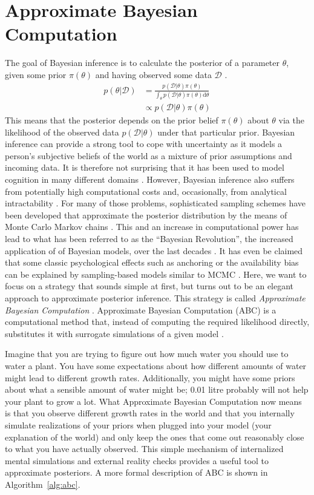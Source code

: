 \documentclass[a4paper,man, natbib]{apa6}
\begin{document}
\section{Approximate Bayesian Computation}
The goal of Bayesian inference is to calculate the posterior of a parameter $\theta$, given some prior $\pi(\theta)$ and having observed some data $\mathcal{D}$ \citep{lindley1972bayesian}.
\begin{align}
p(\theta|\mathcal{D})&=\frac{p(\mathcal{D}|\theta)\pi(\theta)}{\int_{\theta} p(\mathcal{D}|\theta)\pi(\theta) \text{d} \theta}\\
& \propto p(\mathcal{D}|\theta)\pi(\theta)
\end{align}
This means that the posterior depends on the prior belief $\pi(\theta)$ about $\theta$ via the likelihood of the observed data $p(\mathcal{D}|\theta)$ under that particular prior. Bayesian inference can provide a strong tool to cope with uncertainty as it models a person's subjective beliefs of the world as a mixture of prior assumptions and incoming data. It is therefore not surprising that it has been used to model cognition in many different domains \citep{oaksford2007bayesian}. However, Bayesian inference also suffers from potentially high computational costs and, occasionally, from analytical intractability \citep{dagum1993approximating}. For many of those problems, sophisticated sampling schemes have been developed that approximate the posterior distribution by the means of Monte Carlo Markov chains \citep{gilks2005markov}. This and an increase in computational power has lead to what has been referred to as the ``Bayesian Revolution'', the increased application of of Bayesian models, over the last decades \citep{brooks2003bayesian}. It has even be claimed that some classic psychological effects such as anchoring or the availability bias can be explained by sampling-based models similar to MCMC \citep{lieder2012burn}. Here, we want to focus on a strategy that sounds simple at first, but turns out to be an elegant approach to approximate posterior inference. This strategy is called \emph{Approximate Bayesian Computation} \citep{turner2012tutorial}. Approximate Bayesian Computation (ABC) is a computational method that, instead of computing the required likelihood directly, substitutes it with surrogate simulations of a given model \citep{csillery2010approximate}.

Imagine that you are trying to figure out how much water you should use to water a plant. You have some expectations about how different amounts of water might lead to different growth rates. Additionally, you might have some priors about what a sensible amount of water might be; 0.01 litre probably will not help your plant to grow a lot. What Approximate Bayesian Computation now means is that you observe different growth rates in the world and that you internally simulate realizations of your priors when plugged into your model (your explanation of the world) and only keep the ones that come out reasonably close to what you have actually observed. This simple mechanism of internalized mental simulations and external reality checks provides a useful tool to approximate posteriors. A more formal description of ABC is shown in Algorithm~\ref{alg:abc}.
 
\end{document}
